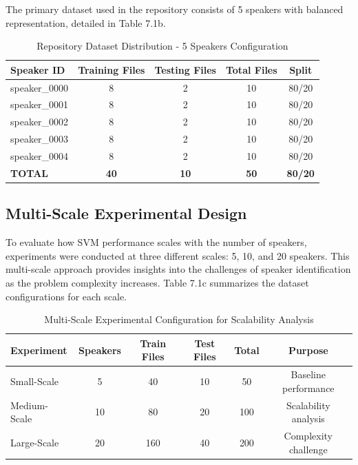 \documentclass[11pt,twoside,openany]{book}
\begin{document}
The primary dataset used in the repository consists of 5 speakers with balanced representation, detailed in Table 7.1b.

\begin{table}[h!]
    \centering
    \begin{tabular}{|l|c|c|c|c|}
        \hline
        \textbf{Speaker ID} & \textbf{Training Files} & \textbf{Testing Files} & \textbf{Total Files}  & \textbf{Split}\\ \hline
         speaker\_0000  & 8 & 2 & 10 & 80/20\\ \hline
         speaker\_0001 & 8 & 2 & 10 & 80/20\\ \hline
         speaker\_0002 & 8 & 2 & 10 & 80/20 \\\hline
         speaker\_0003 & 8 & 2 & 10 & 80/20 \\\hline
         speaker\_0004 & 8 & 2 & 10 & 80/20 \\\hline
         \textbf{TOTAL} & \textbf{40} & \textbf{10} & \textbf{50} & \textbf{80/20} \\\hline
    \end{tabular}
    \caption{Repository Dataset Distribution - 5 Speakers Configuration}
    \label{tab:repo_5speakers}
\end{table}

\subsection{Multi-Scale Experimental Design}
To evaluate how SVM performance scales with the number of speakers, experiments were conducted at three different scales: 5, 10, and 20 speakers. This multi-scale approach provides insights into the challenges of speaker identification as the problem complexity increases. Table 7.1c summarizes the dataset configurations for each scale.

\begin{table}[h!]
    \centering
    \begin{tabular}{|l|c|c|c|c|c|}
        \hline
        \textbf{Experiment} & \textbf{Speakers} & \textbf{Train Files} & \textbf{Test Files} & \textbf{Total} & \textbf{Purpose}\\ \hline
        Small-Scale & 5 & 40 & 10 & 50 & Baseline performance\\ \hline
        Medium-Scale & 10 & 80 & 20 & 100 & Scalability analysis\\ \hline
        Large-Scale & 20 & 160 & 40 & 200 & Complexity challenge\\ \hline
    \end{tabular}
    \caption{Multi-Scale Experimental Configuration for Scalability Analysis}
    \label{tab:multiscale_config}
\end{table}
\end{document}
